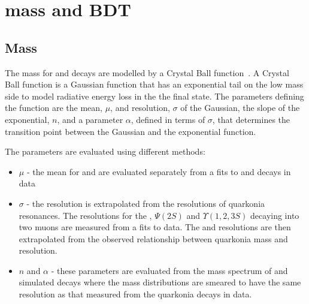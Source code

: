 \section{\bsmumu mass and BDT \pdfs}
\label{sec:signalPdfs}

\subsection{Mass \pdfs}
The mass \pdfs for \bdmumu and \bsmumu decays are modelled by a Crystal Ball function~\cite{}. A Crystal Ball function is a Gaussian function that has an exponential tail on the low mass side to model radiative energy loss in the the final state. The parameters defining the function are the mean, $\mu$, and resolution, $\sigma$ of the Gaussian, the slope of the exponential, $n$, and a parameter $\alpha$, defined in terms of $\sigma$, that determines the transition point between the Gaussian and the exponential function. 

The parameters are evaluated using different methods:
\begin{itemize}
\item $\mu$ - the mean for \bd and \bs are evaluated separately from a fits to \bdkpi and \bskk decays in data
\item $\sigma$ - the resolution is extrapolated from the resolutions of quarkonia resonances. The resolutions for the \jpsi, $\Psi (2S)$ and $\Upsilon(1, 2, 3S)$ decaying into two muons are measured from a fits to data. The \bd and \bs resolutions are then extrapolated from the observed relationship between quarkonia mass and resolution.
\item $n$ and $\alpha$ - these parameters are evaluated from the mass spectrum of \bdmumu and \bsmumu simulated decays where the mass distributions are smeared to have the same resolution as that measured from the quarkonia decays in data.
\end{itemize}

